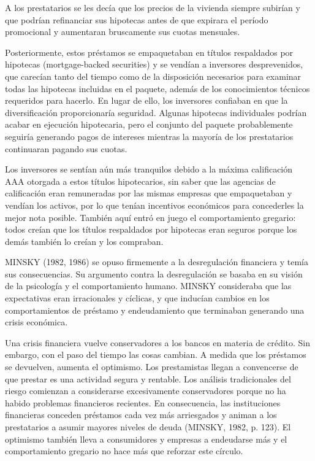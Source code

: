 \documentclass[10pt,a4paper]{article}
\begin{document}
A los prestatarios se les decía que los precios de la vivienda siempre subirían y que podrían refinanciar sus hipotecas antes de que expirara el período promocional y aumentaran bruscamente sus cuotas mensuales.

Posteriormente, estos préstamos se empaquetaban en títulos respaldados por hipotecas (mortgage-backed securities) y se vendían a inversores desprevenidos, que carecían tanto del tiempo como de la disposición necesarios para examinar todas las hipotecas incluidas en el paquete, además de los conocimientos técnicos requeridos para hacerlo. En lugar de ello, los inversores confiaban en que la diversificación proporcionaría seguridad. Algunas hipotecas individuales podrían acabar en ejecución hipotecaria, pero el conjunto del paquete probablemente seguiría generando pagos de intereses mientras la mayoría de los prestatarios continuaran pagando sus cuotas.

Los inversores se sentían aún más tranquilos debido a la máxima calificación AAA otorgada a estos títulos hipotecarios, sin saber que las agencias de calificación eran remuneradas por las mismas empresas que empaquetaban y vendían los activos, por lo que tenían incentivos económicos para concederles la mejor nota posible. También aquí entró en juego el comportamiento gregario: todos creían que los títulos respaldados por hipotecas eran seguros porque los demás también lo creían y los compraban.

MINSKY (1982, 1986) se opuso firmemente a la desregulación financiera y temía sus consecuencias. Su argumento contra la desregulación se basaba en su visión de la psicología y el comportamiento humano. MINSKY consideraba que las expectativas eran irracionales y cíclicas, y que inducían cambios en los comportamientos de préstamo y endeudamiento que terminaban generando una crisis económica.

Una crisis financiera vuelve conservadores a los bancos en materia de crédito. Sin embargo, con el paso del tiempo las cosas cambian. A medida que los préstamos se devuelven, aumenta el optimismo. Los prestamistas llegan a convencerse de que prestar es una actividad segura y rentable. Los análisis tradicionales del riesgo comienzan a considerarse excesivamente conservadores porque no ha habido problemas financieros recientes. En consecuencia, las instituciones financieras conceden préstamos cada vez más arriesgados y animan a los prestatarios a asumir mayores niveles de deuda (MINSKY, 1982, p. 123). El optimismo también lleva a consumidores y empresas a endeudarse más y el comportamiento gregario no hace más que reforzar este círculo.
\end{document}
